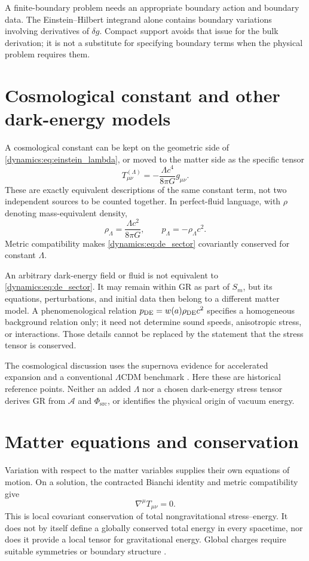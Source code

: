 \documentclass[11pt,oneside]{report}
\newcommand{\Sub}{\mathcal A}
\newcommand{\PhiSrc}{\Phi_{\mathrm{src}}}
\theoremstyle{remark}
\numberwithin{definition}{chapter}
\numberwithin{proposition}{chapter}
\numberwithin{remark}{chapter}
\begin{document}
A finite-boundary problem needs an appropriate boundary action and boundary data. The Einstein--Hilbert integrand alone contains boundary variations involving derivatives of $\delta g$. Compact support avoids that issue for the bulk derivation; it is not a substitute for specifying boundary terms when the physical problem requires them.

\section{Cosmological constant and other dark-energy models}
A cosmological constant can be kept on the geometric side of \eqref{dynamics:eq:einstein_lambda}, or moved to the matter side as the specific tensor
\begin{equation}
T^{(\Lambda)}_{\mu\nu}=-\frac{\Lambda c^4}{8\pi G}g_{\mu\nu}.
\label{dynamics:eq:de_sector}
\end{equation}
These are exactly equivalent descriptions of the same constant term, not two independent sources to be counted together. In perfect-fluid language, with $\rho$ denoting mass-equivalent density,
\begin{equation}
\rho_\Lambda=\frac{\Lambda c^2}{8\pi G},\qquad
p_\Lambda=-\rho_\Lambda c^2.
\end{equation}
Metric compatibility makes \eqref{dynamics:eq:de_sector} covariantly conserved for constant $\Lambda$.

An arbitrary dark-energy field or fluid is not equivalent to \eqref{dynamics:eq:de_sector}. It may remain within GR as part of $S_m$, but its equations, perturbations, and initial data then belong to a different matter model. A phenomenological relation $p_{\rm DE}=w(a)\rho_{\rm DE}c^2$ specifies a homogeneous background relation only; it need not determine sound speeds, anisotropic stress, or interactions. Those details cannot be replaced by the statement that the stress tensor is conserved.

The cosmological discussion uses the supernova evidence for accelerated expansion and a conventional $\Lambda$CDM benchmark \parencite{Riess1998,Perlmutter1999,Planck2018Parameters}. Here these are historical reference points. Neither an added $\Lambda$ nor a chosen dark-energy stress tensor derives GR from $\Sub$ and $\PhiSrc$, or identifies the physical origin of vacuum energy.

\section{Matter equations and conservation}
Variation with respect to the matter variables supplies their own equations of motion. On a solution, the contracted Bianchi identity and metric compatibility give
\begin{equation}
\nabla^\mu T_{\mu\nu}=0.
\label{dynamics:eq:conservation}
\end{equation}
This is local covariant conservation of total nongravitational stress--energy. It does not by itself define a globally conserved total energy in every spacetime, nor does it provide a local tensor for gravitational energy. Global charges require suitable symmetries or boundary structure \parencite{Carroll1997,ADM1962}.
\end{document}
